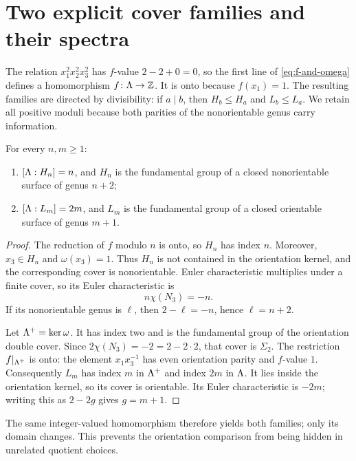 \section{Two explicit cover families and their spectra}
\label{sec:subgroup-counts}

The relation $x_1^2x_2^2x_3^2$ has $f$-value
$2-2+0=0$, so the first line of \eqref{eq:f-and-omega} defines a homomorphism
$f\colon\Lambda\to\mathbb{Z}$.  It is onto because $f(x_1)=1$.
The resulting families are directed by divisibility: if $a\mid b$, then
$H_b\leq H_a$ and $L_b\leq L_a$.  We retain all
positive moduli because both parities of the nonorientable genus carry
information.

\begin{lemma}
\label{lem:family-topology}
For every $n,m\geq1$:
\begin{enumerate}
 \item $[\Lambda:H_n]=n$, and $H_n$ is the fundamental group of a closed
 nonorientable surface of genus $n+2$;
 \item $[\Lambda:L_m]=2m$, and $L_m$ is the fundamental group of a closed
 orientable surface of genus $m+1$.
\end{enumerate}
\end{lemma}

\begin{proof}
The reduction of $f$ modulo $n$ is onto, so $H_n$ has index $n$.  Moreover,
$x_3\in H_n$ and $\omega(x_3)=1$.  Thus $H_n$ is not contained in the
orientation kernel, and the corresponding cover is nonorientable.  Euler
characteristic multiplies under a finite cover, so its Euler characteristic
is
\[
 n\chi(N_3)=-n.
\]
If its nonorientable genus is $\ell$, then $2-\ell=-n$, hence $\ell=n+2$.

Let $\Lambda^+=\ker\omega$.  It has index two and is the fundamental group
of the orientation double cover.  Since
$2\chi(N_3)=-2=2-2\cdot2$, that cover is $\Sigma_2$.  The restriction
$f|_{\Lambda^+}$ is onto: the element $x_1x_3^{-1}$ has even orientation
parity and $f$-value $1$.  Consequently $L_m$ has index $m$ in
$\Lambda^+$ and index $2m$ in $\Lambda$.  It lies inside the
orientation kernel, so its cover is orientable.  Its Euler characteristic is
$-2m$; writing this as $2-2g$ gives $g=m+1$.
\end{proof}

The same integer-valued homomorphism therefore yields both families; only its
domain changes.  This prevents the orientation comparison from being hidden
in unrelated quotient choices.

